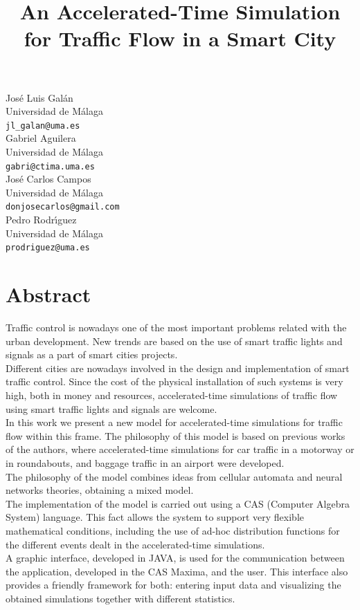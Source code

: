 \documentclass[article,A4,11pt]{llncs}%
\begin{document}
\title{An Accelerated-Time Simulation for Traffic Flow in a Smart City}
 \author{} \institute{}
\maketitle
\begin{center}
{\large Jos\'e Luis Gal\'an}\\
Universidad de M\'alaga\\
{\tt jl\_galan@uma.es}
\\ \vspace{4mm}
{\large Gabriel Aguilera}\\
Universidad de M\'alaga\\
{\tt gabri@ctima.uma.es}
\\ \vspace{4mm}
{\large Jos\'e Carlos Campos}\\
Universidad de M\'alaga\\
{\tt donjosecarlos@gmail.com}
\\ \vspace{4mm}
{\large Pedro Rodr\'{\i}guez}\\
Universidad de M\'alaga\\
{\tt prodriguez@uma.es}
\end{center}

\section*{Abstract}
Traffic control is nowadays one of the most important problems related with the urban development. New trends are based on the use of smart traffic lights and signals as a part of smart cities projects.
\\
Different cities are nowadays involved in the design and implementation of smart traffic control. Since the cost of the physical installation of such systems is very high, both in money and resources, accelerated-time simulations of traffic flow using smart traffic lights and signals are welcome.
\\
In this work we present a new model for accelerated-time simulations for traffic flow within this frame. The philosophy of this model is based on previous works of the authors, where accelerated-time simulations for car traffic in a motorway or in roundabouts, and baggage traffic in an airport were developed.
\\
The philosophy of the model combines ideas from cellular automata and neural networks theories, obtaining a mixed model.
\\
The implementation of the model is carried out using a CAS (Computer Algebra System) language. This fact allows the system to support very flexible mathematical conditions, including the use of ad-hoc distribution functions for the different events dealt in the accelerated-time simulations.
\\
A graphic interface, developed in JAVA, is used for the communication between the application, developed in the CAS Maxima, and the user. This interface also provides a friendly framework for both: entering input data and visualizing the obtained simulations together with different statistics.
\end{document}
